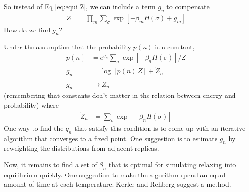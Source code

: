 \documentclass[aps,prl,twocolumn]{revtex4-1}
\begin{document}
So instead of Eq \ref{eq:equi Z}, we can include a term $g_n$ to compensate
\begin{align}
	Z &= \prod_{m} \sum_\sigma \exp\left[ -\beta_m H(\sigma) +g_m \right]
\end{align}
How do we find $g_n$?

Under the assumption that the probability $p(n)$ is a constant,
\begin{align}
	p(n) &= e^{g_n} \sum_\sigma \exp\left[ -\beta_n H(\sigma) \right]/Z\\
	g_n &= \log[p(n)\,Z] + \tilde{Z}_n\\
	g_n &\rightarrow \tilde{Z}_n
\end{align}
(remembering that constants don't matter in the relation between energy and probability) where 
\begin{align}
	\tilde{Z}_n &= \sum_\sigma \exp\left[ -\beta_n H(\sigma) \right]
\end{align}
One way to find the $g_n$ that satisfy this condition is to come up with an iterative algorithm that converges to a fixed point. One suggestion is to estimate $g_n$ by reweighting the distributions from adjacent replicas.

Now, it remains to find a set of $\beta_n$ that is optimal for simulating relaxing into equilibrium quickly. One suggestion to make the algorithm spend an equal amount of time at each temperature. Kerler and Rehberg suggest a method.


\end{document}

